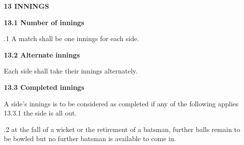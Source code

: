 \documentclass[12pt]{article}
\begin{document}
\vspace{\baselineskip}
{\fontsize{16pt}{19.2pt}\selectfont \textbf{13 INNINGS}\par}\par


\vspace{\baselineskip}
{\fontsize{11pt}{13.2pt}\selectfont \textbf{13.1 \tabto{0.47in} Number of innings}\par}\par


\vspace{\baselineskip}
{\fontsize{9pt}{10.8pt}.1 \tabto{0.49in} A match shall be one innings for each side.\par}\par


\vspace{\baselineskip}
{\fontsize{11pt}{13.2pt}\selectfont \textbf{13.2 \tabto{0.47in} Alternate innings}\par}\par


\vspace{\baselineskip}
{\fontsize{9pt}{10.8pt}\selectfont Each side shall take their innings alternately.\par}\par


\vspace{\baselineskip}
{\fontsize{11pt}{13.2pt}\selectfont \textbf{13.3 \tabto{0.47in} Completed innings}\par}\par


\vspace{\baselineskip}
\begin{adjustwidth}{0.0in}{2.14in}
{\fontsize{9pt}{10.8pt}\selectfont A side’s innings is to be considered as completed if any of the following applies 13.3.1 the side is all out.\par}\par

\end{adjustwidth}


\vspace{\baselineskip}
\begin{adjustwidth}{0.5in}{0.5in}
{\fontsize{9pt}{10.8pt}.2 \tabto{0.49in} at the fall of a wicket or the retirement of a batsman, further balls remain to be bowled but no further batsman is available to come in.\par}\par

\end{adjustwidth}
\end{document}
